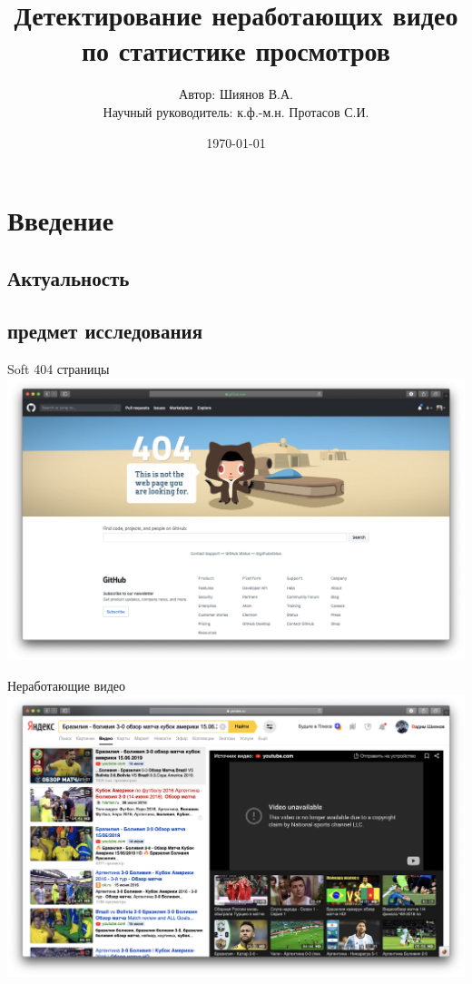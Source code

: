 \documentclass{beamer}
\title{Детектирование неработающих видео \\
по статистике просмотров}
\author{Автор: Шиянов В.А. \\
Научный руководитель: к.ф.-м.н. Протасов С.И.}
\institute{МФТИ}
\date{\today}
\begin{document}
\begin{frame}
    \titlepage
\end{frame}


\section{Введение}

\subsection{Актуальность}
\subsection{предмет исследования}

\begin{frame}{Soft 404 страницы}
    \includegraphics[width=\textwidth]{../images/github_soft404.png}
\end{frame}

\begin{frame}{Неработающие видео}
    \includegraphics[width=\textwidth]{../images/yandex_video_bad.png}
\end{frame}
\end{document}
